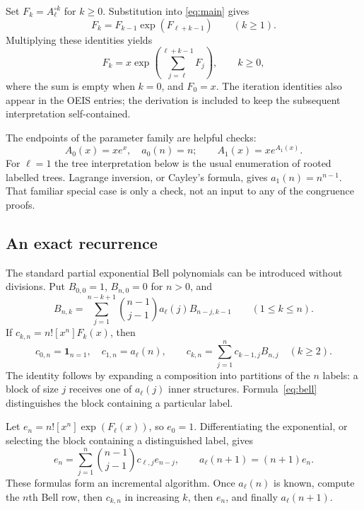 \documentclass[11pt,letterpaper]{article}
\theoremstyle{definition}
\theoremstyle{remark}
\newcommand{\ind}{\mathbf 1}
\begin{document}
Set $F_k=A_\ell^{\circ k}$ for $k\ge0$. Substitution into
\eqref{eq:main} gives
\[
 F_k=F_{k-1}\exp(F_{\ell+k-1})\qquad(k\ge1).
\]
Multiplying these identities yields
\begin{equation}\label{eq:typesystem}
 F_k=x\exp\left(\sum_{j=\ell}^{\ell+k-1}F_j\right),\qquad k\ge0,
\end{equation}
where the sum is empty when $k=0$, and $F_0=x$. The iteration identities
also appear in the OEIS entries; the derivation is included to keep the
subsequent interpretation self-contained.

The endpoints of the parameter family are helpful checks:
\begin{equation}\label{eq:endpoints}
 A_0(x)=xe^x,\quad a_0(n)=n;
 \qquad A_1(x)=xe^{A_1(x)}.
\end{equation}
For $\ell=1$ the tree interpretation below is the usual enumeration of
rooted labelled trees. Lagrange inversion, or Cayley's formula, gives
$a_1(n)=n^{n-1}$. That familiar special case is only a check, not an input
to any of the congruence proofs.

\subsection{An exact recurrence}
The standard partial exponential Bell polynomials can be introduced
without divisions. Put $B_{0,0}=1$, $B_{n,0}=0$ for $n>0$, and
\begin{equation}\label{eq:bell}
 B_{n,k}=\sum_{j=1}^{n-k+1}\binom{n-1}{j-1}a_\ell(j)B_{n-j,k-1}
 \qquad(1\le k\le n).
\end{equation}
If $c_{k,n}=n![x^n]F_k(x)$, then
\begin{equation}\label{eq:composition}
 c_{0,n}=\ind_{n=1},\quad c_{1,n}=a_\ell(n),\qquad
 c_{k,n}=\sum_{j=1}^n c_{k-1,j}B_{n,j}\quad(k\ge2).
\end{equation}
The identity follows by expanding a composition into partitions of the
$n$ labels: a block of size $j$ receives one of $a_\ell(j)$ inner
structures. Formula~\eqref{eq:bell} distinguishes the block containing
a particular label.

Let $e_n=n![x^n]\exp(F_\ell(x))$, so $e_0=1$. Differentiating the
exponential, or selecting the block containing a distinguished label,
gives
\begin{equation}\label{eq:expcoeff}
 e_n=\sum_{j=1}^n\binom{n-1}{j-1}c_{\ell,j}e_{n-j},
 \qquad a_\ell(n+1)=(n+1)e_n.
\end{equation}
These formulas form an incremental algorithm. Once $a_\ell(n)$ is known,
compute the $n$th Bell row, then $c_{k,n}$ in increasing $k$, then $e_n$,
and finally $a_\ell(n+1)$.
\end{document}
